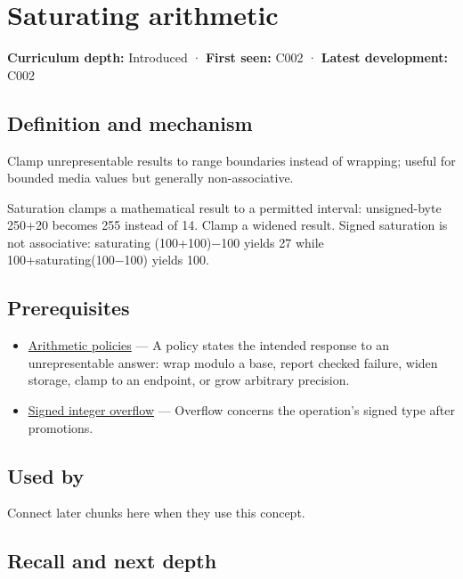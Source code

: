\hypertarget{appendix-3999c6209649}{}
\section{Saturating arithmetic}\label{appendix-3999c6209649-saturating-arithmetic}

\textbf{Curriculum depth:} Introduced · \textbf{First seen:} C002 · \textbf{Latest development:} C002

\subsection{Definition and mechanism}\label{appendix-3999c6209649-definition-and-mechanism}

Clamp unrepresentable results to range boundaries instead of wrapping; useful for bounded media values but generally non-associative.

Saturation clamps a mathematical result to a permitted interval: unsigned-byte 250+20 becomes 255 instead of 14. Clamp a widened result. Signed saturation is not associative: saturating (100+100)−100 yields 27 while 100+saturating(100−100) yields 100.

\subsection{Prerequisites}\label{appendix-3999c6209649-prerequisites}

\begin{itemize}
\tightlist
\item
  \hyperref[appendix-2ed044358b82]{Arithmetic policies} --- A policy states the intended response to an unrepresentable answer: wrap modulo a base, report checked failure, widen storage, clamp to an endpoint, or grow arbitrary precision.
\item
  \hyperref[appendix-1a599c924a4e]{Signed integer overflow} --- Overflow concerns the operation's signed type after promotions.
\end{itemize}

\subsection{Used by}\label{appendix-3999c6209649-used-by}

Connect later chunks here when they use this concept.

\subsection{Recall and next depth}\label{appendix-3999c6209649-recall-and-next-depth}

